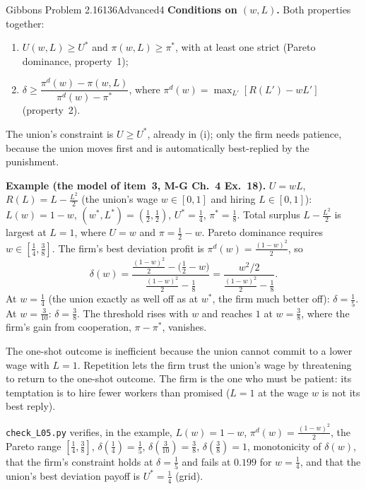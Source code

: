 \begin{exsol}{Gibbons Problem 2.16}{136}{Advanced}{4}
\textbf{Conditions on $(w,L)$.} Both properties together:
\begin{enumerate}[label=(\roman*)]
  \item $U(w,L) \ge U^*$ and $\pi(w,L) \ge \pi^*$, with at least one strict (Pareto dominance, property~1);
  \item $\delta \ge \dfrac{\pi^d(w) - \pi(w,L)}{\pi^d(w) - \pi^*}$, where $\pi^d(w) = \max_{L'}[R(L') - wL']$ (property~2).
\end{enumerate}
The union's constraint is $U \ge U^*$, already in (i); only the firm needs patience, because the union moves
first and is automatically best-replied by the punishment.

\textbf{Example (the model of item~3, M-G Ch.~4 Ex.~18).} $U = wL$, $R(L) = L - \frac{L^2}2$ (the union's wage $w \in [0,1]$ and hiring
$L \in [0,1]$): $L(w) = 1 - w$, $(w^*,L^*) = (\frac12,\frac12)$, $U^* = \frac14$, $\pi^* = \frac18$. Total surplus $L - \frac{L^2}{2}$ is
largest at $L = 1$, where $U = w$ and $\pi = \frac12 - w$. Pareto dominance requires $w \in [\frac14, \frac38]$. The firm's best deviation
profit is $\pi^d(w) = \frac{(1-w)^2}{2}$, so
\[
  \delta(w) = \frac{\frac{(1-w)^2}{2} - \bigl(\frac12 - w\bigr)}{\frac{(1-w)^2}{2} - \frac18} = \frac{w^2/2}{\frac{(1-w)^2}2 - \frac18} .
\]
At $w = \frac14$ (the union exactly as well off as at $w^*$, the firm much better off): $\delta = \frac15$. At $w = \frac3{10}$: $\delta = \frac38$.
The threshold rises with $w$ and reaches $1$ at $w = \frac38$, where the firm's gain from cooperation, $\pi - \pi^*$, vanishes.

\interp The one-shot outcome is inefficient because the union cannot commit to a lower wage with $L = 1$. Repetition lets the
firm trust the union's wage by threatening to return to the one-shot outcome. The firm is the one who must be
patient: its temptation is to hire fewer workers than promised ($L = 1$ at the wage $w$ is not its best reply).

\verify \texttt{check\_L05.py} verifies, in the example, $L(w) = 1-w$, $\pi^d(w) = \frac{(1-w)^2}{2}$, the Pareto range $[\frac14, \frac38]$,
$\delta(\frac14) = \frac15$, $\delta(\frac3{10}) = \frac38$, $\delta(\frac38) = 1$, monotonicity of $\delta(w)$, that the firm's constraint holds at
$\delta = \frac15$ and fails at $0.199$ for $w = \frac14$, and that the union's best deviation payoff is $U^* = \frac14$ (grid).

\end{exsol}

